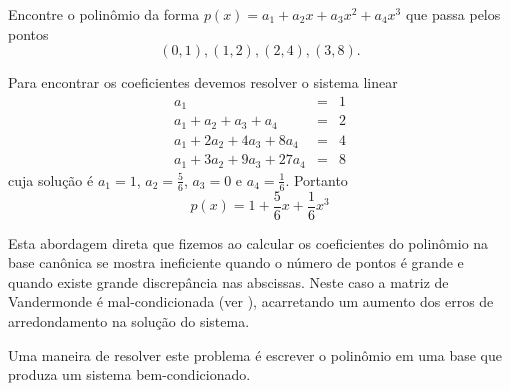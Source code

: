 \begin{ex} Encontre o polinômio da forma $p(x)=a_1+a_2x+a_3x^2+a_4x^3$ que passa pelos pontos
$$(0,1),(1,2),(2,4),(3,8).$$

Para encontrar os coeficientes devemos resolver o sistema linear
\begin{eqnarray*}
a_1                &=&1\\
a_1+ a_2+ a_3+  a_4&=&2\\
a_1+2a_2+4a_3+ 8a_4&=&4\\
a_1+3a_2+9a_3+27a_4&=&8
\end{eqnarray*}
cuja solução é $a_1=1$, $a_2=\frac{5}{6}$, $a_3=0$ e $a_4=\frac{1}{6}$. Portanto
$$p(x)=1+\frac{5}{6}x+\frac{1}{6}x^3$$
\end{ex}


Esta abordagem direta que fizemos ao calcular os coeficientes do polinômio na base canônica se mostra ineficiente quando o número de pontos é grande e quando existe grande discrepância nas abscissas. Neste caso a matriz de Vandermonde é mal-condicionada (ver \cite{Gautschi}), acarretando um aumento dos erros de arredondamento na solução do sistema.

Uma maneira de resolver este problema é escrever o polinômio em uma base que produza um sistema bem-condicionado.

